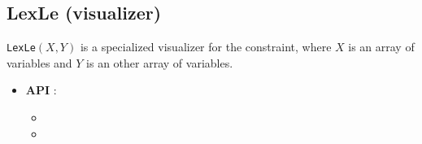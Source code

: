 \subsection{LexLe (visualizer)}\label{lexle:visu}\hypertarget{lexle:visu}{}
\begin{notedef}
  \texttt{LexLe}$(X, Y)$ is a specialized visualizer for the  constraint, where $X$ is an array of variables and $Y$ is an other array of variables.
\end{notedef}

\begin{itemize}
	\item \textbf{API} : 
	\begin{itemize}
	\item {}
	\item {}
	\end{itemize}
\end{itemize}

%

